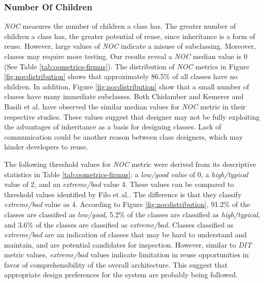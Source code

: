 \subsubsection{Number Of Children}
\textit{NOC} measures the number of children a class has. The greater number of children a class has, the greater potential of reuse, since inheritance is a form of reuse. However, large values of \textit{NOC} indicate a misuse of subclassing\cite{basili1996validation}. Moreover, classes may require more testing. Our results reveal a \textit{NOC} median value is 0 (See Table \ref{tab:oometrics-firmus}). The distribution of \textit{NOC} metrics in Figure \ref{fig:nocdistribution} shows that approximately 86.5\% of all classes have no children. In addition, Figure \ref{fig:nocdistribution} show that a small number of classes have many immediate subclasses. Both Chidamber and Kemerer\cite{chidamber1994metrics} and Basili et al.\cite{basili1996validation} have observed the similar median values for \textit{NOC} metric in their respective studies. These values suggest that designer may not be fully exploiting the advantages of inheritance as a basis for designing classes. Lack of communication could be another reason between class designers, which may hinder developers to reuse.

The following threshold values for \textit{NOC} metric were derived from its descriptive statistics in Table \ref{tab:oometrics-firmus}: a \textit{low/good value} of 0, a \textit{high/typical} value of 2, and an \textit{extreme/bad} value 4. These values can be compared to threshold values identified by Filo et al.\cite{tarcisio}. The difference is that they classify \textit{extreme/bad} value as 4. According to Figure \ref{fig:nocdistribution}, 91.2\% of the classes are classified as \textit{low/good}, 5.2\% of the classes are classified as \textit{high/typical}, and 3.6\% of the classes are classified as \textit{extreme/bad}. Classes classified as \textit{extreme/bad} are an indication of classes that may be hard to understand and maintain, and are potential candidates for inspection. However, similar to \textit{DIT} metric values, \textit{extreme/bad} values indicate limitation in reuse opportunities in favor of comprehensibility of the overall architecture. This suggest that appropriate design preferences for the system are probably being followed. 


